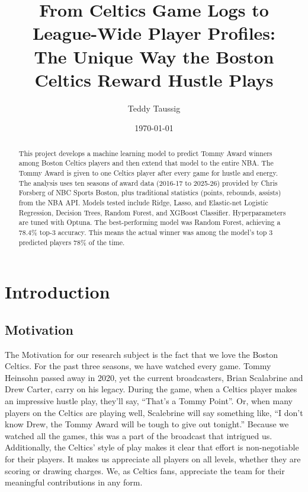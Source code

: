 \documentclass[11pt]{article}
\title{From Celtics Game Logs to League-Wide Player Profiles:\\
The Unique Way the Boston Celtics Reward Hustle Plays}
\author{Teddy Taussig}
\date{\today}
\begin{document}
\maketitle

\begin{abstract}
This project develops a machine learning model to predict Tommy Award winners among Boston Celtics players and then extend that model to the entire NBA. The Tommy Award is given to one Celtics player after every game for hustle and energy. The analysis uses ten seasons of award data (2016-17 to 2025-26) provided by Chris Forsberg of NBC Sports Boston, plus traditional statistics (points, rebounds, assists) from the NBA API. Models tested include Ridge, Lasso, and Elastic-net Logistic Regression, Decision Trees, Random Forest, and XGBoost Classifier. Hyperparameters are tuned with Optuna. The best-performing model was Random Forest, achieving a 78.4\% top-3 accuracy. This means the actual winner was among the model's top 3 predicted players 78\% of the time.
\end{abstract}

\section{Introduction}

\subsection{Motivation}
The Motivation for our research subject is the fact that we love the Boston Celtics. For the past three seasons, we have watched every game. Tommy Heinsohn passed away in 2020, yet the current broadcasters, Brian Scalabrine and Drew Carter, carry on his legacy. During the game, when a Celtics player makes an impressive hustle play, they’ll say, “That's a Tommy Point”. Or, when many players on the Celtics are playing well, Scalebrine will say something like, “I don’t know Drew, the Tommy Award will be tough to give out tonight.” Because we watched all the games, this was a part of the broadcast that intrigued us. Additionally, the Celtics' style of play makes it clear that effort is non-negotiable for their players. It makes us appreciate all players on all levels, whether they are scoring or drawing charges. We, as Celtics fans, appreciate the team for their meaningful contributions in any form.
\end{document}
